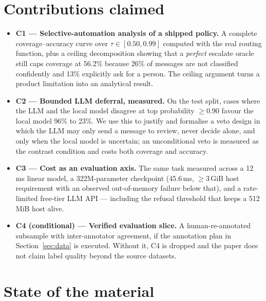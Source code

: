 \documentclass[11pt]{article}
\begin{document}
\section{Contributions claimed}
\begin{itemize}[leftmargin=*,itemsep=2pt,topsep=3pt]
      \item \textbf{C1 --- Selective-automation analysis of a shipped policy.}
      A complete coverage--accuracy curve over $\tau \in [0.50, 0.99]$ computed
      with the real routing function, plus a ceiling decomposition showing that
      a \emph{perfect} escalate oracle still caps coverage at 56.2\% because
      26\% of messages are not classified confidently and 13\% explicitly ask
      for a person. The ceiling argument turns a product limitation into an
      analytical result.
      \item \textbf{C2 --- Bounded LLM deferral, measured.} On the test split,
      cases where the LLM and the local model disagree at top probability
      $\geq 0.90$ favour the local model 96\% to 23\%. We use this to justify
      and formalise a veto design in which the LLM may only send a message to
      review, never decide alone, and only when the local model is uncertain;
      an unconditional veto is measured as the contrast condition and costs
      both coverage and accuracy.
      \item \textbf{C3 --- Cost as an evaluation axis.} The same task measured
      across a 12\,ms linear model, a 322M-parameter checkpoint (45.6\,ms,
      $\geq$3\,GiB host requirement with an observed out-of-memory failure below
      that), and a rate-limited free-tier LLM API --- including the refusal
      threshold that keeps a 512\,MiB host alive.
      \item \textbf{C4 (conditional) --- Verified evaluation slice.} A
      human-re-annotated subsample with inter-annotator agreement, if the
      annotation plan in Section~\ref{sec:data} is executed. Without it, C4 is
      dropped and the paper does not claim label quality beyond the source
      datasets.
\end{itemize}

\section{State of the material}
\end{document}
